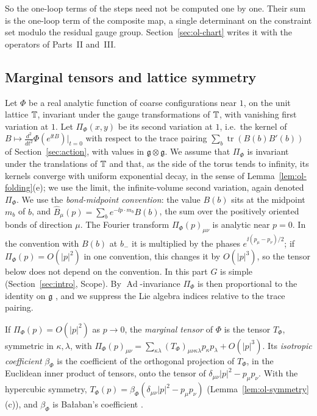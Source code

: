So the one-loop terms of the steps need not be computed one by one. Their sum is the one-loop term of the composite map, a single determinant on the constraint set modulo the residual gauge group. Section~\ref{sec:ol-chart} writes it with the operators of Parts~II and~III.

\subsection{Marginal tensors and lattice symmetry}\label{subsec:ol-marginal}

Let $\Phi$ be a real analytic function of coarse configurations near $1$, on the unit lattice $\mathbb T$, invariant under the gauge transformations of $\mathbb T$, with vanishing first variation at $1$. Let $\Pi_\Phi(x,y)$ be its second variation at $1$, i.e.\ the kernel of $B\mapsto\frac{d^2}{dt^2}\Phi(e^{\ii tB})|_{t=0}$ with respect to the trace pairing $\sum_b\operatorname{tr}(B(b)B'(b))$ of Section~\ref{sec:action}, with values in $\mathfrak g\otimes\mathfrak g$. We assume that $\Pi_\Phi$ is invariant under the translations of $\mathbb T$ and that, as the side of the torus tends to infinity, its kernels converge with uniform exponential decay, in the sense of Lemma~\ref{lem:ol-folding}(e); we use the limit, the infinite-volume second variation, again denoted $\Pi_\Phi$. We use the \emph{bond-midpoint convention}: the value $B(b)$ sits at the midpoint $m_b$ of $b$, and $\hat B_\mu(p)=\sum_be^{-\ii p\cdot m_b}B(b)$, the sum over the positively oriented bonds of direction $\mu$. The Fourier transform $\Pi_\Phi(p)_{\mu\nu}$ is analytic near $p=0$. In the convention with $B(b)$ at $b_-$ it is multiplied by the phases $e^{\ii(p_\mu-p_\nu)/2}$; if $\Pi_\Phi(p)=O(|p|^2)$ in one convention, this changes it by $O(|p|^3)$, so the tensor below does not depend on the convention. In this part $G$ is simple (Section~\ref{sec:intro}, Scope). By $\operatorname{Ad}$-invariance $\Pi_\Phi$ is then proportional to the identity on $\mathfrak g$ \cite[(4.33)]{BalYM4I}, and we suppress the Lie algebra indices relative to the trace pairing.

\begin{definition}\label{def:marginal-tensor}
If $\Pi_\Phi(p)=O(|p|^2)$ as $p\to0$, the \emph{marginal tensor} of $\Phi$ is the tensor $T_\Phi$, symmetric in $\kappa,\lambda$, with $\Pi_\Phi(p)_{\mu\nu}=\sum_{\kappa\lambda}(T_\Phi)_{\mu\nu\kappa\lambda}p_\kappa p_\lambda+O(|p|^3)$. Its \emph{isotropic coefficient} $\beta_\Phi$ is the coefficient of the orthogonal projection of $T_\Phi$, in the Euclidean inner product of tensors, onto the tensor of $\delta_{\mu\nu}|p|^2-p_\mu p_\nu$. With the hypercubic symmetry, $T_\Phi(p)=\beta_\Phi(\delta_{\mu\nu}|p|^2-p_\mu p_\nu)$ (Lemma~\ref{lem:ol-symmetry}(c)), and $\beta_\Phi$ is Ba\l aban's coefficient \cite[(5.37), (5.42)]{BalYM4I}.
\end{definition}

